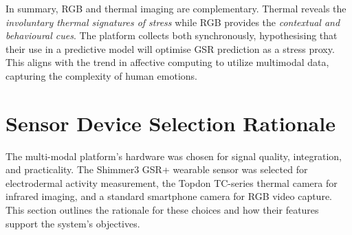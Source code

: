 In summary, RGB and thermal imaging are complementary. Thermal reveals the \emph{involuntary thermal signatures of stress} while RGB provides the \emph{contextual and behavioural cues}. The platform collects both synchronously, hypothesising that their use in a predictive model will optimise GSR prediction as a stress proxy. This aligns with the trend in affective computing to utilize multimodal data, capturing the complexity of human emotions.


\section{Sensor Device Selection Rationale}
The multi-modal platform's hardware was chosen for signal quality, integration, and practicality. The Shimmer3 GSR+ wearable sensor was selected for electrodermal activity measurement, the Topdon TC-series thermal camera for infrared imaging, and a standard smartphone camera for RGB video capture. This section outlines the rationale for these choices and how their features support the system's objectives.

